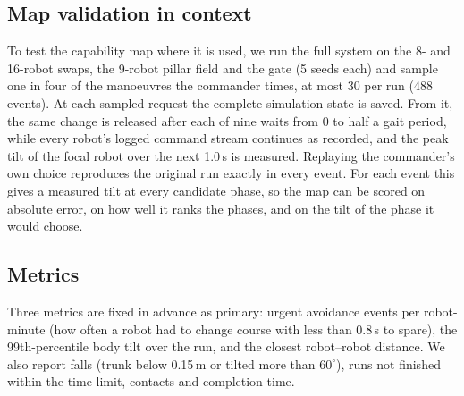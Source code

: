 \documentclass[pdflatex,sn-mathphys-num]{sn-jnl}
\begin{document}
\subsection{Map validation in context}\label{sec:replay-setup}
To test the capability map where it is used, we run the full system on the 8- and 16-robot swaps, the
9-robot pillar field and the gate (5 seeds each) and sample one in four of the manoeuvres the commander
times, at most 30 per run (488 events). At each sampled request the complete simulation state is saved.
From it, the same change is released after each of nine waits from 0 to half a gait period, while every
robot's logged command stream continues as recorded, and the peak tilt of the focal robot over the next
1.0\,s is measured. Replaying the commander's own choice reproduces the original run exactly in every
event. For each event this gives a measured tilt at every candidate phase, so the map can be scored on
absolute error, on how well it ranks the phases, and on the tilt of the phase it would choose.

\subsection{Metrics}
Three metrics are fixed in advance as primary: urgent avoidance events per robot-minute
(how often a robot had to change course with less than 0.8\,s to spare), the 99th-percentile body tilt over
the run, and the closest robot--robot distance. We also report falls (trunk below 0.15\,m or tilted more than
$60^\circ$), runs not finished within the time limit, contacts and completion time.
\end{document}
